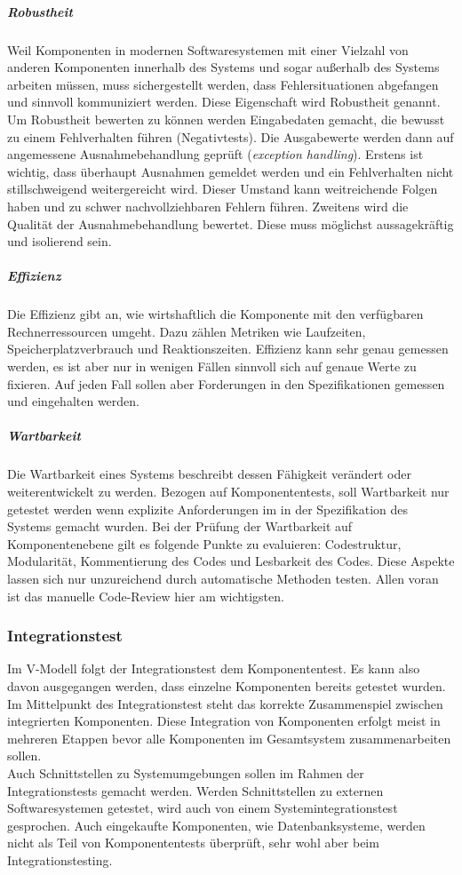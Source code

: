 \subparagraph{Robustheit} Weil Komponenten in modernen Softwaresystemen mit einer Vielzahl von anderen Komponenten innerhalb des Systems und sogar außerhalb des Systems arbeiten müssen, muss sichergestellt werden, dass Fehlersituationen abgefangen und sinnvoll kommuniziert werden. Diese Eigenschaft wird Robustheit genannt. Um Robustheit bewerten zu können werden Eingabedaten gemacht, die bewusst zu einem Fehlverhalten führen (Negativtests). Die Ausgabewerte werden dann auf angemessene Ausnahmebehandlung geprüft (\textit{exception handling}). Erstens ist wichtig, dass überhaupt Ausnahmen gemeldet werden und ein Fehlverhalten nicht stillschweigend weitergereicht wird. Dieser Umstand kann weitreichende Folgen haben und zu schwer nachvollziehbaren Fehlern führen. Zweitens wird die Qualität der Ausnahmebehandlung bewertet. Diese muss möglichst aussagekräftig und isolierend sein.

\subparagraph{Effizienz} Die Effizienz gibt an, wie wirtshaftlich die Komponente mit den verfügbaren Rechnerressourcen umgeht\cite{spillner_basiswissen_2012}. Dazu zählen Metriken wie Laufzeiten, Speicherplatzverbrauch und Reaktionszeiten. Effizienz kann sehr genau gemessen werden, es ist aber nur in wenigen Fällen sinnvoll sich auf genaue Werte zu fixieren. Auf jeden Fall sollen aber Forderungen in den Spezifikationen gemessen und eingehalten werden.

\subparagraph{Wartbarkeit}
Die Wartbarkeit eines Systems beschreibt dessen Fähigkeit verändert oder weiterentwickelt zu werden. Bezogen auf Komponententests, soll Wartbarkeit nur getestet werden wenn explizite Anforderungen im in der Spezifikation des Systems gemacht wurden. Bei der Prüfung der Wartbarkeit auf Komponentenebene gilt es folgende Punkte zu evaluieren: Codestruktur, Modularität, Kommentierung des Codes und Lesbarkeit des Codes. Diese Aspekte lassen sich nur unzureichend durch automatische Methoden testen. Allen voran ist das manuelle Code-Review hier am wichtigsten\cite{spillner_basiswissen_2012}.

\subsubsection{Integrationstest}
Im V-Modell folgt der Integrationstest dem Komponententest. Es kann also davon ausgegangen werden, dass einzelne Komponenten bereits getestet wurden. Im Mittelpunkt des Integrationstest steht das korrekte Zusammenspiel zwischen integrierten Komponenten. Diese Integration von Komponenten erfolgt meist in mehreren Etappen bevor alle Komponenten im Gesamtsystem zusammenarbeiten sollen.\\
Auch Schnittstellen zu Systemumgebungen sollen im Rahmen der Integrationstests gemacht werden. Werden Schnittstellen zu externen Softwaresystemen getestet, wird auch von einem Systemintegrationstest gesprochen\cite{spillner_basiswissen_2012}. Auch eingekaufte Komponenten, wie Datenbanksysteme, werden nicht als Teil von Komponententests überprüft, sehr wohl aber beim Integrationstesting.

